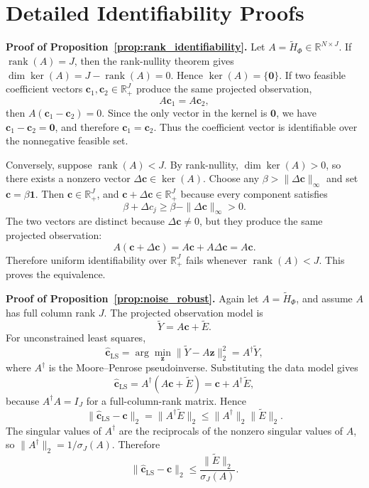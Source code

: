 \section{Detailed Identifiability Proofs}
\label{app:identifiability_proofs}

\noindent\textbf{Proof of Proposition~\ref{prop:rank_identifiability}.}
Let \(A=\widetilde H_\Phi\in\mathbb R^{N\times J}\).  If
\(\operatorname{rank}(A)=J\), then the rank-nullity theorem gives
\(\dim\ker(A)=J-\operatorname{rank}(A)=0\).  Hence
\(\ker(A)=\{\mathbf 0\}\).  If two feasible coefficient vectors
\(\mathbf c_1,\mathbf c_2\in\mathbb R_+^J\) produce the same projected
observation,
\[
A\mathbf c_1=A\mathbf c_2,
\]
then \(A(\mathbf c_1-\mathbf c_2)=0\).  Since the only vector in the kernel is
\(\mathbf 0\), we have \(\mathbf c_1-\mathbf c_2=\mathbf 0\), and therefore
\(\mathbf c_1=\mathbf c_2\).  Thus the coefficient vector is identifiable over
the nonnegative feasible set.

Conversely, suppose \(\operatorname{rank}(A)<J\).  By rank-nullity,
\(\dim\ker(A)>0\), so there exists a nonzero vector
\(\Delta\mathbf c\in\ker(A)\).  Choose any \(\beta>\|\Delta\mathbf c\|_\infty\)
and set \(\mathbf c=\beta\mathbf 1\).  Then \(\mathbf c\in\mathbb R_+^J\), and
\(\mathbf c+\Delta\mathbf c\in\mathbb R_+^J\) because every component satisfies
\[
\beta+\Delta c_j\ge \beta-\|\Delta\mathbf c\|_\infty>0.
\]
The two vectors are distinct because \(\Delta\mathbf c\ne0\), but they produce
the same projected observation:
\[
A(\mathbf c+\Delta\mathbf c)
=A\mathbf c+A\Delta\mathbf c
=A\mathbf c.
\]
Therefore uniform identifiability over \(\mathbb R_+^J\) fails whenever
\(\operatorname{rank}(A)<J\).  This proves the equivalence.

\noindent\textbf{Proof of Proposition~\ref{prop:noise_robust}.}
Again let \(A=\widetilde H_\Phi\), and assume \(A\) has full column rank
\(J\).  The projected observation model is
\[
\widetilde Y=A\mathbf c+\widetilde E.
\]
For unconstrained least squares,
\[
\widehat{\mathbf c}_{\mathrm{LS}}
=\arg\min_{\mathbf z}\|\widetilde Y-A\mathbf z\|_2^2
=A^\dagger\widetilde Y,
\]
where \(A^\dagger\) is the Moore--Penrose pseudoinverse.  Substituting the data
model gives
\[
\widehat{\mathbf c}_{\mathrm{LS}}
=A^\dagger(A\mathbf c+\widetilde E)
=\mathbf c+A^\dagger\widetilde E,
\]
because \(A^\dagger A=I_J\) for a full-column-rank matrix.  Hence
\[
\|\widehat{\mathbf c}_{\mathrm{LS}}-\mathbf c\|_2
=\|A^\dagger\widetilde E\|_2
\le \|A^\dagger\|_2\|\widetilde E\|_2.
\]
The singular values of \(A^\dagger\) are the reciprocals of the nonzero
singular values of \(A\), so \(\|A^\dagger\|_2=1/\sigma_J(A)\).  Therefore
\[
\|\widehat{\mathbf c}_{\mathrm{LS}}-\mathbf c\|_2
\le
\frac{\|\widetilde E\|_2}{\sigma_J(A)}.
\]

